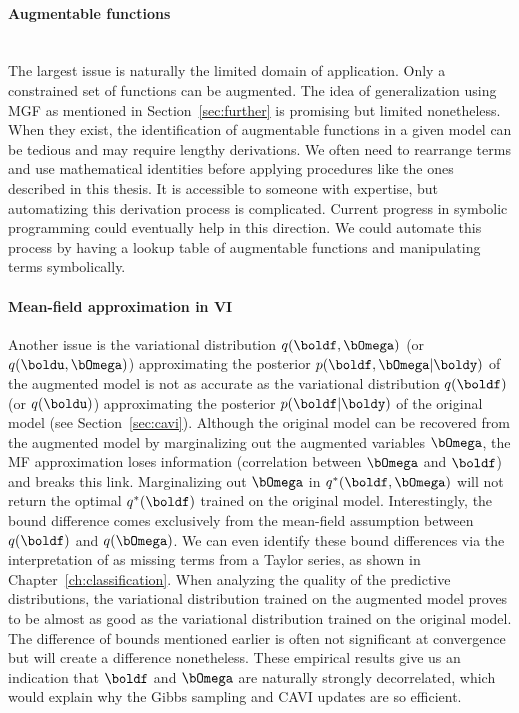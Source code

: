 \paragraph[]{Augmentable functions}\mbox{}\\
The largest issue is naturally the limited domain of application. 
Only a constrained set of functions can be augmented.
The idea of generalization using \ac{MGF} as mentioned in Section~\ref{sec:further} is promising but limited nonetheless.
When they exist, the identification of augmentable functions in a given model can be tedious and may require lengthy derivations.
We often need to rearrange terms and use mathematical identities before applying procedures like the ones described in this thesis.
It is accessible to someone with expertise, but automatizing this derivation process is complicated.
Current progress in symbolic programming could eventually help in this direction.
We could automate this process by having a lookup table of augmentable functions and manipulating terms symbolically.

\paragraph[]{Mean-field approximation in \ac{VI}}\mbox\\
Another issue is the variational distribution $q(\boldf, \bOmega)$ (or $q(\boldu, \bOmega)$) approximating the posterior $p(\boldf, \bOmega|\boldy)$ of the augmented model is not as accurate as the variational distribution $q(\boldf)$ (or $q(\boldu)$) approximating the posterior $p(\boldf|\boldy)$ of the original model (see Section~\ref{sec:cavi}).
Although the original model can be recovered from the augmented model by marginalizing out the augmented variables $\bOmega$, the \ac{MF} approximation loses information (correlation between $\bOmega$ and $\boldf$) and breaks this link.
Marginalizing out $\bOmega$ in $q^*(\boldf, \bOmega)$ will not return the optimal $q^*(\boldf)$ trained on the original model.
Interestingly, the bound difference comes exclusively from the mean-field assumption between $q(\boldf)$ and $q(\bOmega)$.
We can even identify these bound differences via the interpretation of \citet{jaakkolaVariationalApproachBayesian1997} as missing terms from a Taylor series, as shown in Chapter~\ref{ch:classification}.
When analyzing the quality of the predictive distributions, the variational distribution trained on the augmented model proves to be almost as good as the variational distribution trained on the original model.
The difference of bounds mentioned earlier is often not significant at convergence but will create a difference nonetheless.
These empirical results give us an indication that $\boldf$ and $\bOmega$ are naturally strongly decorrelated, which would explain why the Gibbs sampling and \ac{CAVI} updates are so efficient.




